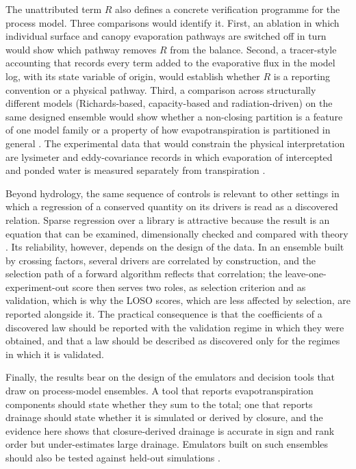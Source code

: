 The unattributed term $R$ also defines a concrete verification programme for the process model. Three comparisons would identify it. First, an ablation in which individual surface and canopy evaporation pathways are switched off in turn would show which pathway removes $R$ from the balance. Second, a tracer-style accounting that records every term added to the evaporative flux in the model log, with its state variable of origin, would establish whether $R$ is a reporting convention or a physical pathway. Third, a comparison across structurally different models (Richards-based, capacity-based and radiation-driven) on the same designed ensemble would show whether a non-closing partition is a feature of one model family or a property of how evapotranspiration is partitioned in general \citep{Simunek2008,Jones2003,Keating2003,Steduto2009}. The experimental data that would constrain the physical interpretation are lysimeter and eddy-covariance records in which evaporation of intercepted and ponded water is measured separately from transpiration \citep{Good2015,Jasechko2013,Schlesinger2014}.

Beyond hydrology, the same sequence of controls is relevant to other settings in which a regression of a conserved quantity on its drivers is read as a discovered relation. Sparse regression over a library is attractive because the result is an equation that can be examined, dimensionally checked and compared with theory \citep{Brunton2016,Udrescu2020,Champion2019}. Its reliability, however, depends on the design of the data. In an ensemble built by crossing factors, several drivers are correlated by construction, and the selection path of a forward algorithm reflects that correlation; the leave-one-experiment-out score then serves two roles, as selection criterion and as validation, which is why the LOSO scores, which are less affected by selection, are reported alongside it. The practical consequence is that the coefficients of a discovered law should be reported with the validation regime in which they were obtained, and that a law should be described as discovered only for the regimes in which it is validated.

Finally, the results bear on the design of the emulators and decision tools that draw on process-model ensembles. A tool that reports evapotranspiration components should state whether they sum to the total; one that reports drainage should state whether it is simulated or derived by closure, and the evidence here shows that closure-derived drainage is accurate in sign and rank order but under-estimates large drainage. Emulators built on such ensembles should also be tested against held-out simulations \citep{Razavi2012,Asher2015,Wilkinson2016}.

